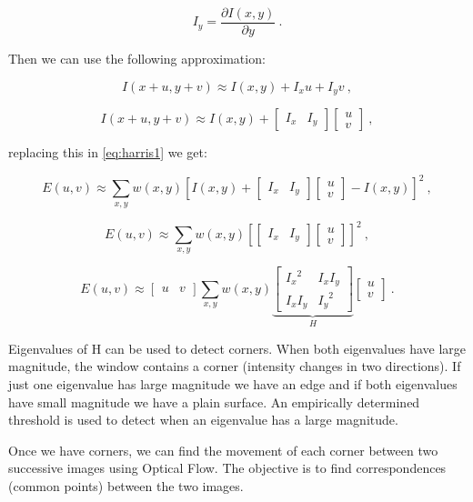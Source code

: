 $$
I_y = \frac{\partial{I(x,y)}}{\partial{y}}\ .
$$

Then we can use the following approximation:

$$
I(x+u,y +v) \approx I(x,y) + I_xu + I_yv\ ,
$$

$$
I(x+u,y +v) \approx I(x,y) + \begin{bmatrix} I_x & I_y \end{bmatrix} \begin{bmatrix} u \\ v \end{bmatrix}\ ,
$$ 

\noindent replacing this in \ref{eq:harris1} we get:

$$
E(u,v) \approx \sum\limits_{x,y} { w(x,y) [I(x,y)  + \begin{bmatrix} I_x & I_y \end{bmatrix} \begin{bmatrix} u \\ v \end{bmatrix} - I(x,y)]^2  }\ ,
$$

$$
E(u,v) \approx \sum\limits_{x,y} { w(x,y) [\begin{bmatrix} I_x & I_y \end{bmatrix} \begin{bmatrix} u \\ v \end{bmatrix} ]^2  }\ ,
$$

$$
E(u,v) \approx \begin{bmatrix} u & v \end{bmatrix} \sum\limits_{x,y} w(x,y) \underbrace{\begin{bmatrix} {I_x}^2 & I_x I_y \\ I_x I_y & {I_y}^2 \end{bmatrix}}_{H} \begin{bmatrix} u \\ v \end{bmatrix}\ .
$$


Eigenvalues of H can be used to detect corners. When both eigenvalues have large magnitude, the window contains a corner (intensity changes in two directions). If just one 
eigenvalue has large magnitude we have an edge and if both eigenvalues have small magnitude we have a plain surface. An empirically determined threshold is used to detect when an eigenvalue has a large magnitude.

Once we have corners, we can find the movement of each corner between two successive images using Optical Flow. The objective 
is to find correspondences (common points) between the two images.

